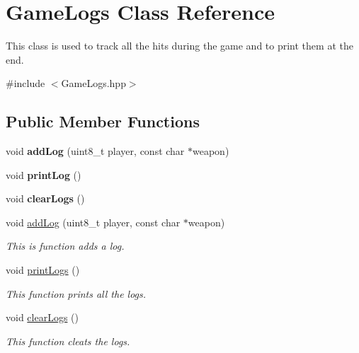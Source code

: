 \hypertarget{class_game_logs}{}\section{Game\+Logs Class Reference}
\label{class_game_logs}


This class is used to track all the hits during the game and to print them at the end.  




{\ttfamily \#include $<$Game\+Logs.\+hpp$>$}

\subsection*{Public Member Functions}
\begin{DoxyCompactItemize}
\item 
\mbox{\label{class_game_logs_aff50867c6abefacf3d80180015f94e70}} 
void {\bfseries add\+Log} (uint8\+\_\+t player, const char $\ast$weapon)
\item 
\mbox{\label{class_game_logs_a2af40236b4dc804f4dc0fac938d0bfd9}} 
void {\bfseries print\+Log} ()
\item 
\mbox{\label{class_game_logs_ab645b6718f2d5ee716c8b4df4dddf561}} 
void {\bfseries clear\+Logs} ()
\item 
void \mbox{\hyperlink{class_game_logs_aff50867c6abefacf3d80180015f94e70}{add\+Log}} (uint8\+\_\+t player, const char $\ast$weapon)
\begin{DoxyCompactList}\small\item\em This is function adds a log. \end{DoxyCompactList}\item 
void \mbox{\hyperlink{class_game_logs_a8c7dec27f1cd0c1b6df508b9e3172459}{print\+Logs}} ()
\begin{DoxyCompactList}\small\item\em This function prints all the logs. \end{DoxyCompactList}\item 
void \mbox{\hyperlink{class_game_logs_ab645b6718f2d5ee716c8b4df4dddf561}{clear\+Logs}} ()
\begin{DoxyCompactList}\small\item\em This function cleats the logs. \end{DoxyCompactList}\end{DoxyCompactItemize}


